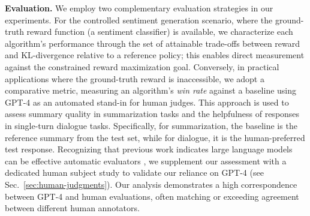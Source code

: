 \textbf{Evaluation.} We employ two complementary evaluation strategies in our experiments. For the controlled sentiment generation scenario, where the ground-truth reward function (a sentiment classifier) is available, we characterize each algorithm’s performance through the set of attainable trade-offs between reward and KL-divergence relative to a reference policy; this enables direct measurement against the constrained reward maximization goal. Conversely, in practical applications where the ground-truth reward is inaccessible, we adopt a comparative metric, measuring an algorithm's \textit{win rate} against a baseline using GPT-4 as an automated stand-in for human judges. This approach is used to assess summary quality in summarization tasks and the helpfulness of responses in single-turn dialogue tasks. Specifically, for summarization, the baseline is the reference summary from the test set, while for dialogue, it is the human-preferred test response. Recognizing that previous work indicates large language models can be effective automatic evaluators \citep{Chen2023ExploringTU}, we supplement our assessment with a dedicated human subject study to validate our reliance on GPT-4 (see Sec.~\ref{sec:human-judgments}). Our analysis demonstrates a high correspondence between GPT-4 and human evaluations, often matching or exceeding agreement between different human annotators.

